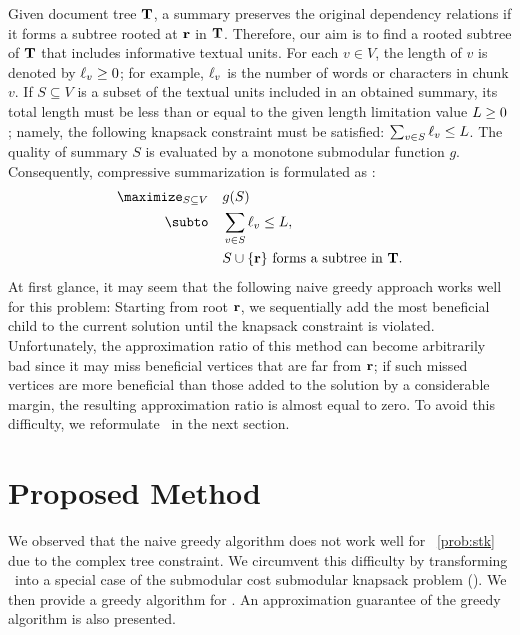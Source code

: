 \documentclass[11pt,a4paper]{article}
\begin{document}
	Given document tree ${\bf T}$, 
	a summary preserves the original dependency relations 
	if it forms a subtree rooted at ${\bf r}$ in ${\bf T}$. 
	Therefore, our aim is to find a rooted subtree of ${\bf T}$ 
	that 
	includes informative textual units.  
	For each $v\in V$, the length of $v$ is denoted by $\ell_v\ge0$; 
	for example, $\ell_v$ is the number of words or characters in chunk $v$.
	If $S\subseteq V$ is a subset of the textual units included in an obtained summary, 
	its total length must be less than or equal to the given length limitation value $L\ge0$; 
	namely,  
	the following {knapsack constraint} must be satisfied: 
	$\sum_{v\in S}\ell_v\le L$. 
	The quality of summary $S$ is 
	evaluated by a monotone submodular function $g$. 
	Consequently, compressive summarization is formulated as \stkp: 
	\begin{align}\label{prob:stk}
		\maximize_{S\subseteq V}\quad  & g(S) \\
		\subto\quad  & \sum_{v\in S} \l_v\le \L,  \nonumber \\
		&\text{$S\cup\{\rd\}$ forms a subtree in $\Td$}. \nonumber   
	\end{align}
	At first glance, 
	it may seem that the following naive greedy approach 
	works well for this problem: 
	Starting from root ${\bf r}$, 
	we sequentially add the most beneficial child 
	to the current solution  
	until the knapsack constraint is violated. 
	Unfortunately, the approximation ratio of 
	this method can become arbitrarily bad 
	since it may miss beneficial vertices that are far from ${\bf r}$; 
	if such missed vertices are more beneficial 
	than those added to the solution  
	by a considerable margin, 
	the resulting approximation ratio is almost equal to zero. 
	To avoid this difficulty, 
	we reformulate \stkp\ 
	in the next section.
	
	
	\section{Proposed Method}\label{section:proposal}
	We observed that 
	the naive greedy algorithm does not work well 
	for \stkp~\eqref{prob:stk} 
	due to the complex tree constraint. 
	We circumvent this difficulty by 
	transforming \stkp\ 
	into a special case of the submodular cost submodular knapsack problem (\scskp). %
	We then provide a greedy algorithm for \scskp. 
	An approximation guarantee of the greedy algorithm 
	is also presented.  
	
\end{document}
